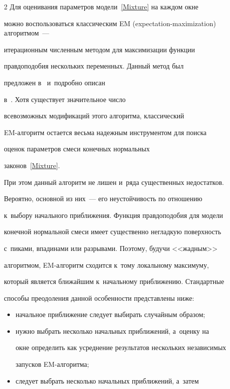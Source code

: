 \begin{multicols}{2}
Для оценивания параметров модели~\eqref{Mixture} на каж\-дом окне


можно воспользоваться классическим EM (expectation-maximization) ал\-го\-рит\-мом~---


итерационным численным методом для максимизации функции


правдоподобия нескольких переменных. Данный метод был


предложен в~\cite{Dempster1977} и~подробно описан


в~\cite{Korolev2011}. Хотя существует значительное чис\-ло


всевозможных модификаций этого алгоритма, классический


EM-ал\-го\-ритм остается весьма надежным инструментом для поиска


оценок параметров смеси конечных нормальных


законов~\eqref{Mixture}.





При этом данный алгоритм не лишен и~ряда существенных недостатков.


Вероятно, основной из них~--- его неустойчивость по отношению 


к~выбору начального приближения. Функция правдоподобия для модели


конечной нормальной смеси  имеет существенно негладкую поверхность 


с~пиками, впадинами или разрывами. Поэтому, будучи <<жадным>>


алгоритмом, EM-ал\-го\-ритм сходится к~тому локальному максимуму,


который является ближайшим к~начальному приближению. Стандартные


способы преодоления данной особенности представлены ниже:


\begin{itemize}


\item начальное приближение следует выбирать случайным образом;


\item нужно выбрать несколько начальных приближений, а~оценку на


окне определить как усреднение результатов нескольких независимых


запусков EM-ал\-го\-ритма;


\item  следует выбрать несколько начальных приближений, а~затем 



\end{itemize}
\end{multicols}

